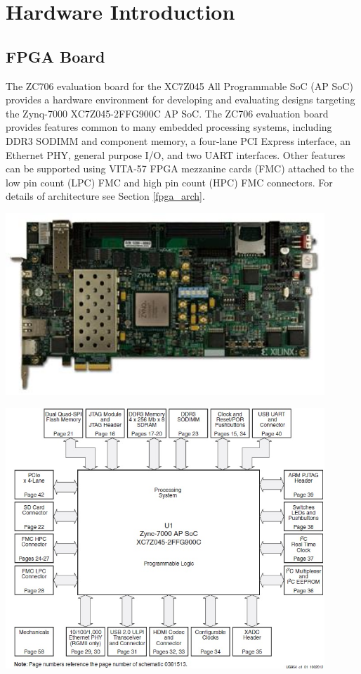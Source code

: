 \section{Hardware Introduction}
\subsection{FPGA Board}

The ZC706 evaluation board for the XC7Z045 All Programmable SoC (AP SoC) provides a hardware environment for developing and evaluating designs targeting the Zynq-7000 XC7Z045-2FFG900C AP SoC. The ZC706 evaluation board provides features common to
many embedded processing systems, including DDR3 SODIMM and component memory, a four-lane PCI Express interface, an Ethernet PHY, general purpose I/O, and two UART interfaces. Other features can be supported using VITA-57 FPGA mezzanine cards (FMC) attached to the low pin count (LPC) FMC and high pin count (HPC) FMC connectors. For details of architecture see Section \ref{fpga_arch}.\\

\begin{center}
\includegraphics[width=12cm]{content/fig/ZC706.JPG}
\end{center}

\begin{center}
\includegraphics[width=12cm]{content/fig/zc706_block_diagram.JPG}
\end{center}


